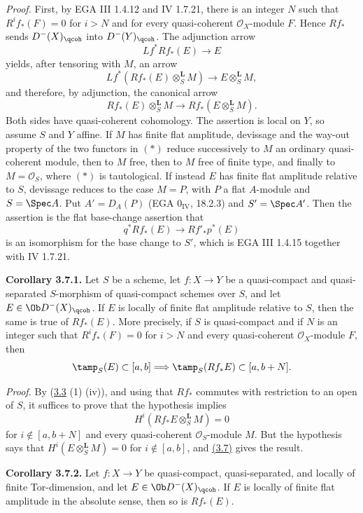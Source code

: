 \emph{Proof.} First, by EGA III 1.4.12 and IV 1.7.21, there is an integer \(N\) such that \(R^if_*(F)=0\) for \(i>N\) and for every quasi-coherent \(\mathcal O_X\)-module \(F\). Hence \(Rf_*\) sends \(D^{-}(X)_{\qcoh}\) into \(D^{-}(Y)_{\qcoh}\). The adjunction arrow
\[
 Lf^*Rf_*(E)\longrightarrow E
\]
yields, after tensoring with \(M\), an arrow
\[
 Lf^*(Rf_*(E)\otimes_S^{\mathbf L}M)
 \longrightarrow E\otimes_S^{\mathbf L}M,
\]
and therefore, by adjunction, the canonical arrow
\[
 Rf_*(E)\otimes_S^{\mathbf L}M
 \longrightarrow Rf_*(E\otimes_S^{\mathbf L}M).\tag{*}
\]
Both sides have quasi-coherent cohomology. The assertion is local on \(Y\), so assume \(S\) and \(Y\) affine. If \(M\) has finite flat amplitude, devissage and the way-out property of the two functors in \((*)\) reduce successively to \(M\) an ordinary quasi-coherent module, then to \(M\) free, then to \(M\) free of finite type, and finally to \(M=\mathcal O_S\), where \((*)\) is tautological. If instead \(E\) has finite flat amplitude relative to \(S\), devissage reduces to the case \(M=P\), with \(P\) a flat \(A\)-module and \(S=\Spec A\). Put \(A'=D_A(P)\) (EGA \(0_{\mathrm{IV}}\), 18.2.3) and \(S'=\Spec A'\). Then the assertion is the flat base-change assertion that
\[
 q^*Rf_*(E)\longrightarrow Rf'_*p^*(E)
\]
is an isomorphism for the base change to \(S'\), which is EGA III 1.4.15 together with IV 1.7.21.

\textbf{Corollary 3.7.1.} Let \(S\) be a scheme, let \(f:X\to Y\) be a quasi-compact and quasi-separated \(S\)-morphism of quasi-compact schemes over \(S\), and let \(E\in\Ob D^{-}(X)_{\qcoh}\). If \(E\) is locally of finite flat amplitude relative to \(S\), then the same is true of \(Rf_*(E)\). More precisely, if \(S\) is quasi-compact and if \(N\) is an integer such that \(R^if_*(F)=0\) for \(i>N\) and every quasi-coherent \(\mathcal O_X\)-module \(F\), then
\[
 \tamp_S(E)\subset[a,b]
 \Longrightarrow
 \tamp_S(Rf_*E)\subset[a,b+N].
\]

\emph{Proof.} By (\hyperlink{sga6.e03.prop.3-3}{3.3} (1) (iv)), and using that \(Rf_*\) commutes with restriction to an open of \(S\), it suffices to prove that the hypothesis implies
\[
 H^i(Rf_*E\otimes_S^{\mathbf L}M)=0
\]
for \(i\notin[a,b+N]\) and every quasi-coherent \(\mathcal O_S\)-module \(M\). But the hypothesis says that \(H^i(E\otimes_S^{\mathbf L}M)=0\) for \(i\notin[a,b]\), and \hyperlink{sga6.e03.prop.3-7}{(3.7)} gives the result.

\textbf{Corollary 3.7.2.} Let \(f:X\to Y\) be quasi-compact, quasi-separated, and locally of finite Tor-dimension, and let \(E\in\Ob D^{-}(X)_{\qcoh}\). If \(E\) is locally of finite flat amplitude in the absolute sense, then so is \(Rf_*(E)\).

